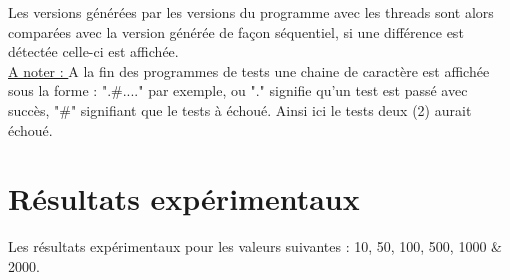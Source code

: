 \documentclass[10pt,a4paper]{article}
\begin{document}
Les versions générées par les versions du programme avec les threads sont alors comparées avec la version générée de façon séquentiel, si une différence est détectée celle-ci est affichée. \\	

\underline{A noter : } A la fin des programmes de tests une chaine de caractère est affichée sous la forme : ".\#...." par exemple, ou "." signifie qu'un test est passé avec succès, "\#" signifiant que le tests à échoué. Ainsi ici le tests deux (2) aurait échoué.

\section{Résultats expérimentaux}

Les résultats expérimentaux pour les valeurs suivantes : 10, 50, 100, 500, 1000 \& 2000. \\
\end{document}
